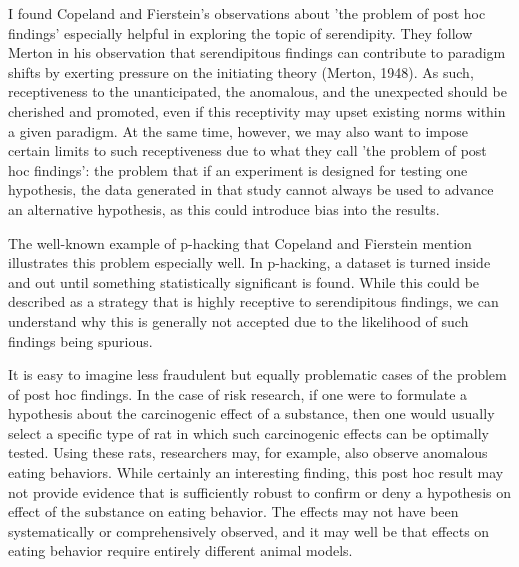 \documentclass[authordate, empirical]{jote-new-article}
\begin{document}

	I found Copeland and Fierstein's observations about 'the problem of post hoc findings' especially helpful in exploring the topic of serendipity. They follow Merton in his observation that serendipitous findings can contribute to paradigm shifts by exerting pressure on the initiating theory (Merton, 1948). As such, receptiveness to the unanticipated, the anomalous, and the unexpected should be cherished and promoted, even if this receptivity may upset existing norms within a given paradigm. At the same time, however, we may also want to impose certain limits to such receptiveness due to what they call 'the problem of post hoc findings': the problem that if an experiment is designed for testing one hypothesis, the data generated in that study cannot always be used to advance an alternative hypothesis, as this could introduce bias into the results.



	The well-known example of p-hacking that Copeland and Fierstein mention illustrates this problem especially well. In p-hacking, a dataset is turned inside and out until something statistically significant is found. While this could be described as a strategy that is highly receptive to serendipitous findings, we can understand why this is generally not accepted due to the likelihood of such findings being spurious.



	It is easy to imagine less fraudulent but equally problematic cases of the problem of post hoc findings. In the case of risk research, if one were to formulate a hypothesis about the carcinogenic effect of a substance, then one would usually select a specific type of rat in which such carcinogenic effects can be optimally tested. Using these rats, researchers may, for example, also observe anomalous eating behaviors. While certainly an interesting finding, this post hoc result may not provide evidence that is sufficiently robust to confirm or deny a hypothesis on effect of the substance on eating behavior. The effects may not have been systematically or comprehensively observed, and it may well be that effects on eating behavior require entirely different animal models.
\end{document}
